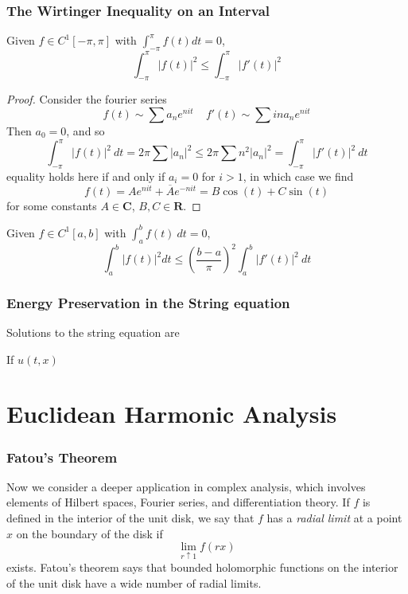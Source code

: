 \section{The Wirtinger Inequality on an Interval}

\begin{theorem}
    Given $f \in C^1[-\pi,\pi]$ with $\int_{-\pi}^\pi f(t) dt = 0$,
    \[ \int_{-\pi}^\pi |f(t)|^2 \leq \int_{-\pi}^\pi |f'(t)|^2 \]
\end{theorem}
\begin{proof}
    Consider the fourier series
    \[ f(t) \sim \sum a_n e^{nit}\ \ \ \ \ f'(t) \sim \sum in a_n e^{nit} \]
    Then $a_0 = 0$, and so
    \[ \int_{-\pi}^\pi |f(t)|^2\ dt = 2 \pi \sum |a_n|^2 \leq 2 \pi \sum n^2 |a_n|^2 = \int_{-\pi}^\pi |f'(t)|^2\ dt \]
    equality holds here if and only if $a_i = 0$ for $i > 1$, in which case we find
    \[ f(t) = A e^{nit} + \overline{A} e^{-nit} = B \cos(t) + C \sin(t) \]
    for some constants $A \in \mathbf{C}$, $B,C \in \mathbf{R}$.
\end{proof}

\begin{corollary}
    Given $f \in C^1[a,b]$ with $\int_a^b f(t)\ dt = 0$,
    \[ \int_a^b |f(t)|^2 dt \leq \left(\frac{b-a}{\pi}\right)^2 \int_a^b |f'(t)|^2\ dt \]
\end{corollary}

\section{Energy Preservation in the String equation}

Solutions to the string equation are

If $u(t,x)$

\part{Euclidean Harmonic Analysis}

\section{Fatou's Theorem}

Now we consider a deeper application in complex analysis, which involves elements of Hilbert spaces, Fourier series, and differentiation theory. If $f$ is defined in the interior of the unit disk, we say that $f$ has a {\it radial limit} at a point $x$ on the boundary of the disk if
%
\[ \lim_{r \uparrow 1} f(rx) \]
%
exists. Fatou's theorem says that bounded holomorphic functions on the interior of the unit disk have a wide number of radial limits.

